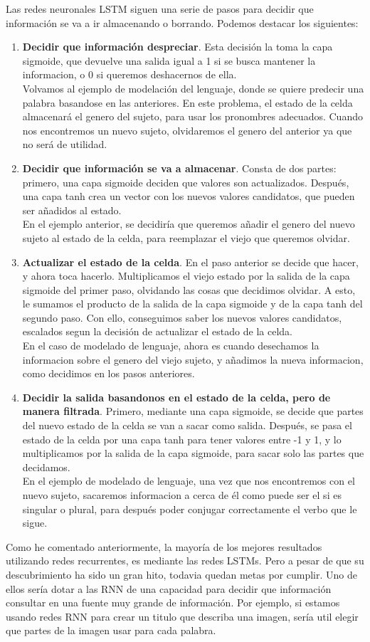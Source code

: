 Las redes neuronales LSTM siguen una serie de pasos para decidir que información se va a ir almacenando o borrando. Podemos destacar los siguientes:
\begin{enumerate}
\item \textbf{Decidir que información despreciar}. Esta decisión la toma la capa sigmoide, que  devuelve una salida igual a 1 si se busca mantener la informacion, o 0 si queremos deshacernos de ella.\\
Volvamos al ejemplo de modelación del lenguaje, donde se quiere predecir una palabra basandose en las anteriores. En este problema, el estado de la celda almacenará el genero del sujeto, para usar los pronombres adecuados. Cuando nos encontremos un nuevo sujeto, olvidaremos el genero del anterior ya que no será de utilidad.
\item \textbf{Decidir que información se va a almacenar}. Consta de dos partes: primero, una capa sigmoide deciden que valores son actualizados. Después, una capa tanh crea un vector con los nuevos valores candidatos, que pueden ser añadidos al estado.\\
En el ejemplo anterior, se decidiría que queremos añadir el genero del nuevo sujeto al estado de la celda, para reemplazar el viejo que queremos olvidar.
\item \textbf{Actualizar el estado de la celda}. En el paso anterior se decide que hacer, y ahora toca hacerlo. Multiplicamos el viejo estado por la salida de la capa sigmoide del primer paso, olvidando las cosas que decidimos olvidar. A esto, le sumamos el producto de la salida de la capa sigmoide y de la capa tanh del segundo paso. Con ello, conseguimos saber los nuevos valores candidatos, escalados segun la decisión de actualizar el estado de la celda.\\
En el caso de modelado de lenguaje, ahora es cuando desechamos la informacion sobre el genero del viejo sujeto, y añadimos la nueva informacion, como decidimos en los pasos anteriores.
\item \textbf{Decidir la salida basandonos en el estado de la celda, pero de manera filtrada}. Primero, mediante una capa sigmoide, se decide que partes del nuevo estado de la celda se van a sacar como salida. Después, se pasa el estado de la celda por una capa tanh para tener valores entre -1 y 1, y lo multiplicamos por la salida de la capa sigmoide, para sacar solo las partes que decidamos.\\
En el ejemplo de modelado de lenguaje, una vez que nos encontremos con el nuevo sujeto, sacaremos informacion a cerca de él como puede ser el si es singular o plural, para después poder conjugar correctamente el verbo que le sigue.
\end{enumerate}
Como he comentado anteriormente, la mayoría de los mejores resultados utilizando redes recurrentes, es mediante las redes LSTMs. Pero a pesar de que su descubrimiento ha sido un gran hito, todavia quedan metas por cumplir. Uno de ellos sería dotar a las RNN de una capacidad para decidir que información consultar en una fuente muy grande de información. Por ejemplo, si estamos usando redes RNN para crear un titulo que describa una imagen, sería util elegir que partes de la imagen usar para cada palabra.
\label{ch:teoria}
